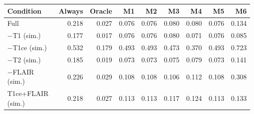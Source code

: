 \begin{tabular}{lrrrrrrrr}
\toprule
Condition & Always & Oracle & M1 & M2 & M3 & M4 & M5 & M6 \\
\midrule
Full & 0.218 & 0.027 & 0.076 & 0.076 & 0.080 & 0.080 & 0.076 & 0.134 \\
$-$T1 (sim.) & 0.177 & 0.017 & 0.076 & 0.076 & 0.080 & 0.071 & 0.076 & 0.085 \\
$-$T1ce (sim.) & 0.532 & 0.179 & 0.493 & 0.493 & 0.473 & 0.370 & 0.493 & 0.723 \\
$-$T2 (sim.) & 0.185 & 0.019 & 0.073 & 0.073 & 0.075 & 0.079 & 0.073 & 0.141 \\
$-$FLAIR (sim.) & 0.226 & 0.029 & 0.108 & 0.108 & 0.106 & 0.112 & 0.108 & 0.308 \\
T1ce+FLAIR (sim.) & 0.218 & 0.027 & 0.113 & 0.113 & 0.117 & 0.124 & 0.113 & 0.133 \\
\bottomrule
\end{tabular}
